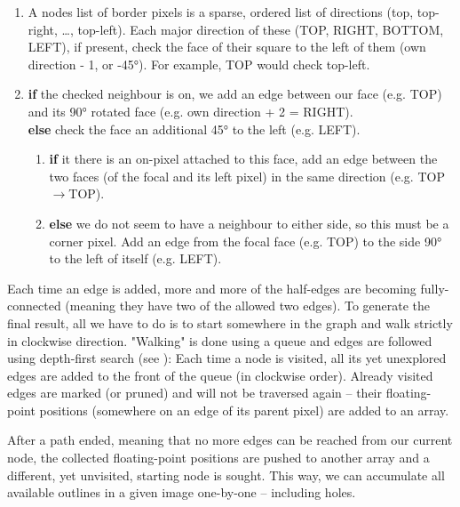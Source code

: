 \documentclass[9pt,lineno]{elife}
\newcommand{\figref}[1]{\textit{\textbf{\ref{#1}}}}
\begin{document}
\begin{appendixbox}

\begin{enumerate}
    \item A nodes list of border pixels is a sparse, ordered list of directions (top, top-right, \dots, top-left). Each major direction of these (TOP, RIGHT, BOTTOM, LEFT), if present, check the face of their square to the left of them (own direction - 1, or -45°). For example, TOP would check top-left.
    \item \textbf{if} the checked neighbour is on, we add an edge between our face (e.g. TOP) and its 90° rotated face (e.g. own direction + 2 = RIGHT).\\
    \textbf{else} check the face an additional 45° to the left (e.g. LEFT). 
    \begin{enumerate}
        \item \textbf{if} it there is an on-pixel attached to this face, add an edge between the two faces (of the focal and its left pixel) in the same direction (e.g. TOP$\rightarrow$TOP).
        \item \textbf{else} we do not seem to have a neighbour to either side, so this must be a corner pixel. Add an edge from the focal face (e.g. TOP) to the side 90° to the left of itself (e.g. LEFT).
    \end{enumerate}
\end{enumerate}

Each time an edge is added, more and more of the half-edges are becoming fully-connected (meaning they have two of the allowed two edges). To generate the final result, all we have to do is to start somewhere in the graph and walk strictly in clockwise direction. "Walking" is done using a queue and edges are followed using depth-first search (see ): Each time a node is visited, all its yet unexplored edges are added to the front of the queue (in clockwise order). Already visited edges are marked (or pruned) and will not be traversed again -- their floating-point positions (somewhere on an edge of its parent pixel) are added to an array. 

After a path ended, meaning that no more edges can be reached from our current node, the collected floating-point positions are pushed to another array and a different, yet unvisited, starting node is sought. This way, we can accumulate all available outlines in a given image one-by-one -- including holes.


\end{appendixbox}
\end{document}
